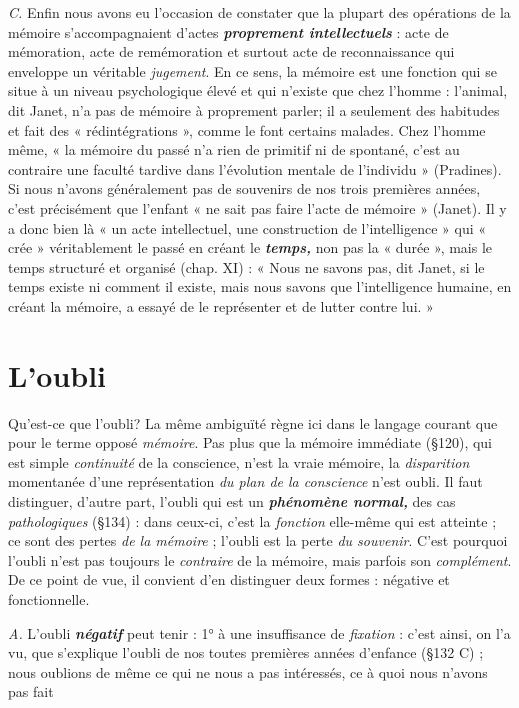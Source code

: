{\it C.} Enfin nous avons eu l’occasion de constater que la plupart des
opérations de la mémoire s’accompagnaient d’actes \textbf{\textit {proprement
intellectuels}} : acte de mémoration, acte de remémoration et surtout
acte de reconnaissance qui enveloppe un véritable {\it jugement}. En ce
sens, la mémoire est une fonction qui se situe à un niveau psychologique
élevé et qui n’existe que chez l’homme : l’animal, dit Janet,
n’a pas de mémoire à proprement parler; il a seulement des habitudes
et fait des « rédintégrations », comme le font certains malades. Chez
l’homme même, « la mémoire du passé n’a rien de primitif ni de
spontané, c’est au contraire une faculté tardive dans l’évolution mentale
de l'individu » (Pradines). Si nous n’avons généralement pas
de souvenirs de nos trois premières années, c’est précisément que
l'enfant « ne sait pas faire l’acte de mémoire » (Janet). Il y a donc
bien là « un acte intellectuel, une construction de l'intelligence » qui
« crée » véritablement le passé en créant le \textbf{\textit {temps,}} non pas la « durée »,
mais le temps structuré et organisé (chap. XI) : « Nous ne savons
pas, dit Janet, si le temps existe ni comment il existe, mais nous
savons que l'intelligence humaine, en créant la mémoire, a essayé de
le représenter et de lutter contre lui. »

\section{L’oubli}%
Qu'est-ce que l'oubli? La même ambiguïté règne
ici dans le langage courant que pour le terme opposé {\it mémoire}. Pas
plus que la mémoire immédiate (\S120), qui est simple {\it continuité} de
la conscience, n’est la vraie mémoire, la {\it disparition} momentanée
d’une représentation {\it du plan de la conscience} n’est oubli. Il faut distinguer,
d’autre part, l’oubli qui est un \textbf{\textit {phénomène normal,}} des
cas {\it pathologiques} (\S 134) :
dans ceux-ci, c’est la {\it fonction}
elle-même qui est atteinte ; ce
sont des pertes {\it de la mémoire} ;
l’oubli est la perte {\it du souvenir}.
C’est pourquoi l’oubli
n’est pas toujours le {\it contraire}
de la mémoire, mais parfois
son {\it complément}. De ce point
de vue, il convient d’en distinguer
deux formes : négative
et fonctionnelle.

{\it A.} L’oubli \textbf{\textit {négatif}} peut
tenir : 1° à une insuffisance
de {\it fixation} : c'est ainsi, on
l’a vu, que s’explique l’oubli
de nos toutes premières années
d’enfance (\S 132 C) ; nous
oublions de même ce qui ne
nous a pas intéressés, ce à
quoi nous n'avons pas fait


